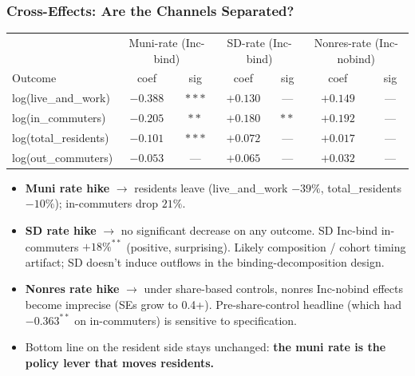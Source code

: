 \documentclass[xcolor = x11names, compress, aspectratio = 169]{beamer}
\begin{document}
    \begin{frame}
    \frametitle{Cross-Effects: Are the Channels Separated?}
        \centering
        \footnotesize
        \renewcommand{\arraystretch}{1.20}
        \setlength{\tabcolsep}{6pt}
        \begin{tabular}{lcc|cc|cc}
            \toprule
            & \multicolumn{2}{c|}{Muni-rate (Inc-bind)} & \multicolumn{2}{c|}{SD-rate (Inc-bind)} & \multicolumn{2}{c}{Nonres-rate (Inc-nobind)} \\
            Outcome & coef & sig & coef & sig & coef & sig \\
            \midrule
            log(live\_and\_work)   & $-0.388$ & $***$ & $+0.130$ & ---   & $+0.149$ & --- \\
            log(in\_commuters)     & $-0.205$ & $**$  & $+0.180$ & $**$  & $+0.192$ & --- \\
            log(total\_residents)  & $-0.101$ & $***$ & $+0.072$ & ---   & $+0.017$ & --- \\
            log(out\_commuters)    & $-0.053$ & ---   & $+0.065$ & ---   & $+0.032$ & --- \\
            \bottomrule
        \end{tabular}
        \medskip

        \footnotesize
        \begin{itemize}\setlength{\itemsep}{0.04cm}
            \item \textbf{Muni rate hike} $\to$ residents leave (live\_and\_work $-39\%$,
            total\_residents $-10\%$); in-commuters drop $21\%$.
            \item \textbf{SD rate hike} $\to$ no significant decrease on any
            outcome. SD Inc-bind in-commuters $+18\%^{**}$ (positive, surprising).
            Likely composition / cohort timing artifact; SD doesn't induce
            outflows in the binding-decomposition design.
            \item \textbf{Nonres rate hike} $\to$ under share-based controls,
            nonres Inc-nobind effects become imprecise (SEs grow to 0.4+).
            Pre-share-control headline (which had $-0.363^{**}$ on in-commuters)
            is sensitive to specification.
            \item Bottom line on the resident side stays unchanged: \textbf{the muni
            rate is the policy lever that moves residents.}
        \end{itemize}
    \end{frame}
\end{document}
